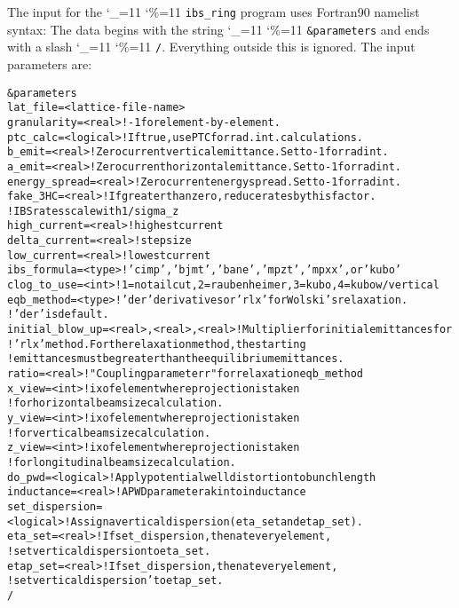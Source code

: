 \documentclass[11pt]{article}
\newcommand\ttcmd{\begingroup\catcode`\_=11 \catcode`\%=11 \dottcmd}
\newcommand\dottcmd[1]{\texttt{#1}\endgroup}
\newcommand{\vn}{\ttcmd}
\newlength{\ExBeg}
\newlength{\ExEnd}
\newenvironment{example}
  {\vspace{\ExBeg} \begin{alltt}}
  {\end{alltt} \vspace{\ExEnd}}
\begin{document}
The input for the \vn{ibs_ring} program uses Fortran90 namelist
syntax: The data begins with the string \vn{\&parameters} and ends
with a slash \vn{/}. Everything outside this is ignored.
The input parameters are:
\begin{example}
\&parameters
  lat_file = <lattice-file-name>
  granularity = <real>   ! -1 for element-by-element.
  ptc_calc = <logical>  ! If true, use PTC for rad. int. calculations.
  b_emit = <real>  ! Zero current vertical emittance.  Set to -1 for rad int.
  a_emit = <real>  ! Zero current horizontal emittance.  Set to -1 for rad int.
  energy_spread = <real>  !Zero current energy spread.  Set to -1 for rad int.
  fake_3HC = <real> ! If greater than zero, reduce rates by this factor.  
                    ! IBS rates scale with 1/sigma_z
  high_current = <real>  ! highest current
  delta_current = <real> ! step size
  low_current = <real>   ! lowest current
  ibs_formula = <type>  ! 'cimp', 'bjmt', 'bane', 'mpzt', 'mpxx', or 'kubo'
  clog_to_use = <int>   ! 1=no tail cut, 2=raubenheimer, 3=kubo, 4=kubo w/vertical
  eqb_method = <type>   ! 'der' derivatives or 'rlx' for Wolski's relaxation.  
                        ! 'der' is default.
  initial_blow_up = <real>, <real>, <real> ! Multiplier for initial emittances for 
                  ! 'rlx' method.  For the relaxation method, the starting 
                  ! emittances must be greater than the equilibrium emittances.
  ratio = <real>  ! "Coupling parameter r" for relaxation eqb_method
  x_view = <int>  ! ix of element where projection is taken 
                  ! for horizontal beam size calculation.
  y_view = <int>  ! ix of element where projection is taken 
                  ! for vertical beam size calculation.
  z_view = <int>  ! ix of element where projection is taken 
                  ! for longitudinal beam size calculation.
  do_pwd = <logical>  ! Apply potential well distortion to bunch length
  inductance = <real>  ! A PWD parameter akin to inductance
  set_dispersion = <logical> ! Assign a vertical dispersion (eta_set and etap_set).
  eta_set = <real> ! If set_dispersion, then at every element, 
                   ! set vertical dispersion to eta_set.
  etap_set = <real> ! If set_dispersion, then at every element, 
                    ! set vertical dispersion' to etap_set.
/
\end{example}
\end{document}
